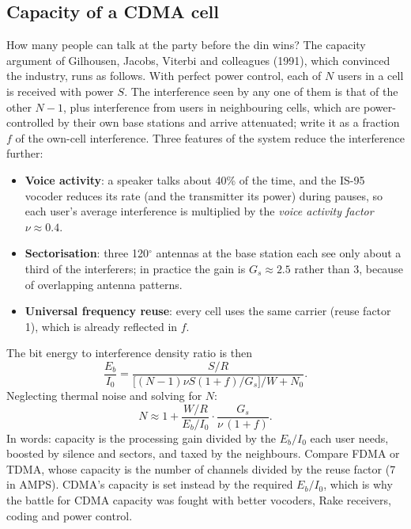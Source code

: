 \subsection{Capacity of a CDMA cell}

How many people can talk at the party before the din wins? The capacity argument of Gilhousen,
Jacobs, Viterbi and colleagues (1991), which convinced the industry, runs as follows. With perfect
power control, each of $N$ users in a cell is received with power $S$. The interference seen by
any one of them is that of the other $N-1$, plus interference from users in neighbouring cells,
which are power-controlled by their own base stations and arrive attenuated; write it as a
fraction $f$ of the own-cell interference. Three features of the system reduce the interference
further:
\begin{itemize}
\item \textbf{Voice activity}: a speaker talks about 40\% of the time, and the IS-95 vocoder
reduces its rate (and the transmitter its power) during pauses, so each user's average
interference is multiplied by the \emph{voice activity factor} $\nu\approx0.4$.
\item \textbf{Sectorisation}: three 120$^\circ$ antennas at the base station each see only
about a third of the interferers; in practice the gain is $G_s\approx2.5$ rather than 3,
because of overlapping antenna patterns.
\item \textbf{Universal frequency reuse}: every cell uses the same carrier (reuse factor 1),
which is already reflected in $f$.
\end{itemize}
The bit energy to interference density ratio is then
\begin{equation}
\frac{E_b}{I_0}=\frac{S/R}{\big[(N-1)\nu S(1+f)/G_s\big]/W+N_0}.
\end{equation}
Neglecting thermal noise and solving for $N$:
\begin{equation}
N\approx1+\frac{W/R}{E_b/I_0}\cdot\frac{G_s}{\nu\,(1+f)}.
\label{eq:ch18:capacity}
\end{equation}
In words: capacity is the processing gain divided by the $E_b/I_0$ each user needs, boosted by
silence and sectors, and taxed by the neighbours. Compare FDMA or TDMA, whose capacity is the
number of channels divided by the reuse factor (7 in AMPS). CDMA's capacity is set instead by the
required $E_b/I_0$, which is why the battle for CDMA capacity was fought with better vocoders,
Rake receivers, coding and power control.


